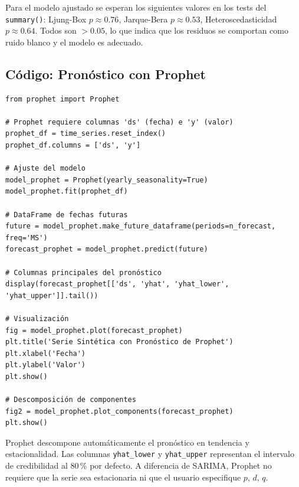 \documentclass[12pt, a4paper]{article}
\begin{document}
\begin{resultado}
  Para el modelo ajustado se esperan los siguientes valores en los tests del
  \texttt{summary()}: Ljung-Box $p \approx 0.76$, Jarque-Bera $p \approx 0.53$,
  Heteroscedasticidad $p \approx 0.64$. Todos son $> 0.05$, lo que indica que
  los residuos se comportan como ruido blanco y el modelo es adecuado.
\end{resultado}

\subsection{Código: Pronóstico con Prophet}

\begin{lstlisting}[caption={Ajuste y pronóstico con el modelo Prophet}]
from prophet import Prophet

# Prophet requiere columnas 'ds' (fecha) e 'y' (valor)
prophet_df = time_series.reset_index()
prophet_df.columns = ['ds', 'y']

# Ajuste del modelo
model_prophet = Prophet(yearly_seasonality=True)
model_prophet.fit(prophet_df)

# DataFrame de fechas futuras
future = model_prophet.make_future_dataframe(periods=n_forecast, freq='MS')
forecast_prophet = model_prophet.predict(future)

# Columnas principales del pronóstico
display(forecast_prophet[['ds', 'yhat', 'yhat_lower', 'yhat_upper']].tail())

# Visualización
fig = model_prophet.plot(forecast_prophet)
plt.title('Serie Sintética con Pronóstico de Prophet')
plt.xlabel('Fecha')
plt.ylabel('Valor')
plt.show()

# Descomposición de componentes
fig2 = model_prophet.plot_components(forecast_prophet)
plt.show()
\end{lstlisting}

\begin{nota}
  Prophet descompone automáticamente el pronóstico en tendencia y
  estacionalidad. Las columnas \texttt{yhat\_lower} y \texttt{yhat\_upper}
  representan el intervalo de credibilidad al 80\,\% por defecto. A diferencia
  de SARIMA, Prophet no requiere que la serie sea estacionaria ni que el
  usuario especifique $p$, $d$, $q$.
\end{nota}

\newpage

\end{document}
